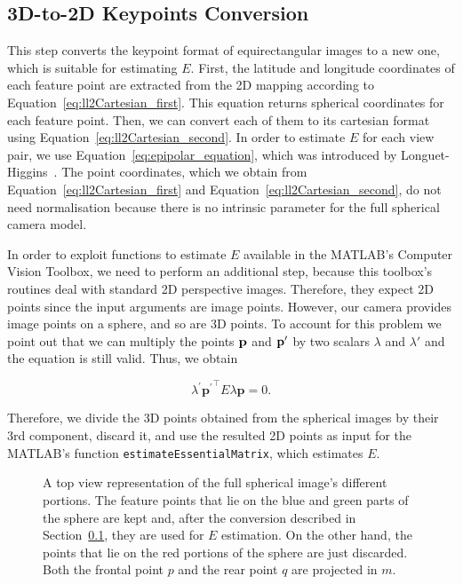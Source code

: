\subsection{3D-to-2D Keypoints Conversion}
\label{sec:keypoints_conversion}
%
This step converts the keypoint format of equirectangular images to a new one, which is
suitable for estimating $E$.
%
First, the latitude and longitude coordinates of each feature point are 
extracted from the 2D mapping according to Equation~\ref{eq:ll2Cartesian_first}.
This equation returns spherical coordinates for each feature point. 
Then, we can convert each of them to its cartesian format using Equation~\ref{eq:ll2Cartesian_second}. 
%
In order to estimate $E$ for each view pair, we use Equation~\ref{eq:epipolar_equation}, which was
introduced by Longuet-Higgins~\cite{longuet1981computer}.
The point coordinates, which we obtain from Equation~\ref{eq:ll2Cartesian_first} and
Equation~\ref{eq:ll2Cartesian_second}, do not need normalisation because there
is no intrinsic parameter for the full spherical camera model.

In order to exploit functions to estimate $E$ available in the MATLAB's Computer Vision Toolbox, we need to perform an additional step, because this toolbox's routines deal with standard 2D perspective images. Therefore, they expect 
2D points since the input arguments are image points. However, our camera provides image points on a sphere, and so are 3D points. To account for this problem we point out that we can multiply the points $\mathbf{p}$ and $\mathbf{p}'$ by two 
scalars ${\lambda}$ and ${\lambda}'$ and the equation is still valid. Thus, we obtain

\begin{equation*}
\lambda^\prime{\mathbf{p}^\prime}^\top E\lambda\mathbf{p} = 0 \text{.}
\end{equation*}

Therefore, we divide the 3D points obtained from the spherical images by their 
3rd component, discard it, and use the resulted 2D points as input for the 
MATLAB's function {\tt estimateEssentialMatrix}, which estimates $E$.

\begin{figure}
    \centering
    \def\svgwidth{0.8\columnwidth}
    
    \caption{A top view representation of the full spherical image's 
    different portions.
    The feature points that lie on the blue and green parts of the sphere are kept and,
    after the conversion described in Section~\ref{sec:keypoints_conversion},
    they are used for $E$ estimation. On the other hand, the points that lie
    on the red portions of the sphere are just discarded.
    Both the frontal point $p$ and the rear point $q$ are projected in $m$.}
	\label{fig:sphere_division}
\end{figure}

